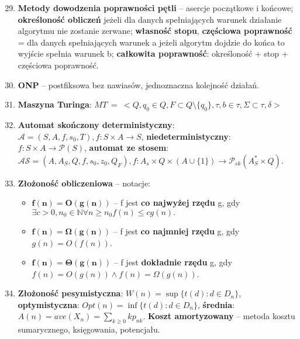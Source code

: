 \documentclass[12pt]{article}
\begin{document}
    \begin{enumerate}
        \setcounter{enumi}{28}
        \item \textbf{Metody dowodzenia poprawności pętli} -- asercje początkowe i końcowe; \textbf{określoność obliczeń}
        jeżeli dla danych spełniających warunek działanie algorytmu nie zostanie zerwane; \textbf{własność stopu},
        \textbf{częściowa poprawność} = dla danych spełniających warunek a jeżeli algorytm dojdzie do końca to wyjście
        spełnia warunek b; \textbf{całkowita poprawność}: określoność + stop + częściowa poprawność.

        \item \textbf{ONP} -- postfiksowa bez nawiasów, jednoznaczna kolejność działań.

        \item \textbf{Maszyna Turinga}: $MT ~ = ~<Q, q_0 \in Q, F \subset Q \setminus \{q_0\}, \tau, b \in \tau, \Sigma \subset \tau, \delta>$

        \item \textbf{Automat skończony deterministyczny}: $\mathcal{A} = (S, A, f, s_{0}, T), f: S\times A \rightarrow S$,
        \textbf{niedeterministyczny}: $f : S \times A \rightarrow \mathcal{P} (S)$, \textbf{automat ze stosem}:
        $\mathcal{AS} = (A, A_{S}, Q, f, s_{0}, z_{0}, Q_{F}), f: A_{s} \times Q \times (A \cup \{1\}) \rightarrow \mathcal{P}_{sk}(A^{*}_{S} \times Q)$.

        \item \textbf{Złożoność obliczeniowa} -- notacje:
        \begin{itemize}[noitemsep]
            \item $\mathbf{f(n) = O(g(n))}$ -- f jest \textbf{co najwyżej rzędu} g, gdy
            $\exists c > 0, n_0 \in \mathbb{N} \forall n \geq n_0 f(n) \leq cg(n).$
            \item $\mathbf{f(n) = \Omega(g(n))}$ -- f jest \textbf{co najmniej rzędu} g, gdy
            $g(n) = O(f(n))$.
            \item $\mathbf{f(n) = \Theta(g(n))}$ -- f jest \textbf{dokładnie rzędu} g, gdy
            $f(n) = O(g(n)) \wedge  f(n) = \Omega(g(n))$.
        \end{itemize}

        \item \textbf{Złożoność pesymistyczna}: $W(n) = \sup\{t(d) : d \in D_n\}$, \textbf{optymistyczna}:
        $Opt(n) = \inf\{t(d) : d \in D_n\}$, \textbf{średnia}: $A(n) = ave(X_n) = \sum_{k \geq 0}kp_{nk}$.
        \textbf{Koszt amortyzowany} -- metoda kosztu sumarycznego, księgowania, potencjału.


\end{enumerate}
\end{document}
